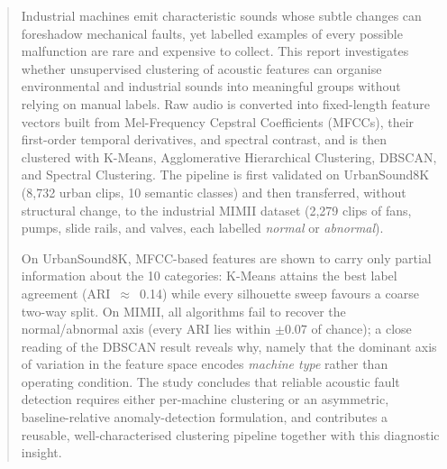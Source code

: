 \documentclass[runningheads,a4paper,11pt]{report}
\begin{document}
\begin{abstract}
Industrial machines emit characteristic sounds whose subtle changes can foreshadow mechanical faults, yet labelled examples of every possible malfunction are rare and expensive to collect. This report investigates whether unsupervised clustering of acoustic features can organise environmental and industrial sounds into meaningful groups without relying on manual labels. Raw audio is converted into fixed-length feature vectors built from Mel-Frequency Cepstral Coefficients (MFCCs), their first-order temporal derivatives, and spectral contrast, and is then clustered with K-Means, Agglomerative Hierarchical Clustering, DBSCAN, and Spectral Clustering. The pipeline is first validated on UrbanSound8K (8{,}732 urban clips, 10 semantic classes) and then transferred, without structural change, to the industrial MIMII dataset (2{,}279 clips of fans, pumps, slide rails, and valves, each labelled \emph{normal} or \emph{abnormal}).

On UrbanSound8K, MFCC-based features are shown to carry only partial information about the 10 categories: K-Means attains the best label agreement (ARI~$\approx$~0.14) while every silhouette sweep favours a coarse two-way split. On MIMII, all algorithms fail to recover the normal/abnormal axis (every ARI lies within $\pm0.07$ of chance); a close reading of the DBSCAN result reveals why, namely that the dominant axis of variation in the feature space encodes \emph{machine type} rather than operating condition. The study concludes that reliable acoustic fault detection requires either per-machine clustering or an asymmetric, baseline-relative anomaly-detection formulation, and contributes a reusable, well-characterised clustering pipeline together with this diagnostic insight.

\end{abstract}


\tableofcontents

\newpage


\newpage


\newpage

\end{document}
